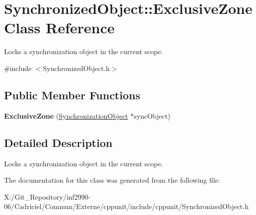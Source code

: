 \hypertarget{class_synchronized_object_1_1_exclusive_zone}{\section{Synchronized\-Object\-:\-:Exclusive\-Zone Class Reference}
\label{class_synchronized_object_1_1_exclusive_zone}
}


Locks a synchronization object in the current scope.  




{\ttfamily \#include $<$Synchronized\-Object.\-h$>$}

\subsection*{Public Member Functions}
\begin{DoxyCompactItemize}
\item 
\hypertarget{class_synchronized_object_1_1_exclusive_zone_ae4393b508828328c2f4816ff9b7b090c}{{\bfseries Exclusive\-Zone} (\hyperlink{class_synchronized_object_1_1_synchronization_object}{Synchronization\-Object} $\ast$sync\-Object)}\label{class_synchronized_object_1_1_exclusive_zone_ae4393b508828328c2f4816ff9b7b090c}

\end{DoxyCompactItemize}


\subsection{Detailed Description}
Locks a synchronization object in the current scope. 

The documentation for this class was generated from the following file\-:\begin{DoxyCompactItemize}
\item 
X\-:/\-Git\-\_\-\-Repository/inf2990-\/06/\-Cadriciel/\-Commun/\-Externe/cppunit/include/cppunit/Synchronized\-Object.\-h\end{DoxyCompactItemize}
